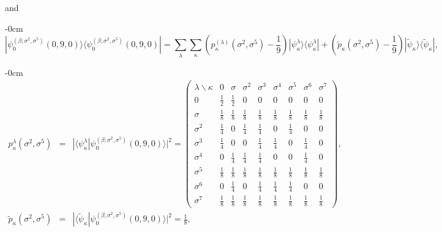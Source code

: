 \documentclass[quantumrep,article,submit,pdftex,moreauthors]{Definitions/mdpi}
\begin{document}
and

\begin{adjustwidth}{-\extralength}{0cm}
\begin{equation}
  |\psi_{0}^{(\beta;\sigma^{2},\sigma^{5})}(0,9,0)\rangle
  \langle \psi_{0}^{(\beta ; \sigma^{2},\sigma^{5})}(0,9,0)|
  = \sum_{\lambda }\sum_{\kappa} \left(
    p_{\kappa }^{(\lambda )}\left( \sigma ^{2},\sigma ^{5}\right) -\frac{1}{9}
  \right)
  |\psi_{\kappa}^{\lambda}\rangle \langle \psi_{\kappa}^{\lambda }|
  + \left( \tilde{p}_{\kappa }(\sigma ^{2},\sigma ^{5})-\frac{1}{9} \right)
  |\tilde{\psi}_{\kappa }\rangle \langle \tilde{\psi}_{\kappa }|,
\end{equation}
\end{adjustwidth}

\begin{adjustwidth}{-\extralength}{0cm}
\begin{eqnarray}
  p_{\kappa }^{\lambda }\left(\sigma^{2}, \sigma^{5}\right)
  &=& |\langle\psi_{\kappa }^{\lambda }
  |\psi_{0}^{(\beta ;\sigma ^{2},\sigma^{5})}(0,9,0)\rangle|^{2}
  = \left(\begin{array}{ccccccccc}
    \lambda \backslash \kappa  & 0 & \sigma  & \sigma ^{2} & \sigma ^{3} &
    \sigma ^{4} & \sigma ^{5} & \sigma ^{6} & \sigma ^{7} \\ 
    0 & \frac{1}{2} & \frac{1}{2} & 0 & 0 & 0 & 0 & 0 & 0 \\ [6pt]
    \sigma & \frac{1}{8} & \frac{1}{8} & \frac{1}{8} & \frac{1}{8} &
    \frac{1}{8} & \frac{1}{8} & \frac{1}{8} & \frac{1}{8} \\  [6pt]
    \sigma^{2} & \frac{1}{4} & 0 & \frac{1}{4} & \frac{1}{4} & 0 &
    \frac{1}{4} & 0 & 0 \\  [6pt]
    \sigma^{3} & \frac{1}{4} & 0 & 0 & \frac{1}{4} & \frac{1}{4} & 0 &
    \frac{1}{4} & 0 \\  [6pt]
    \sigma^{4} & 0 & \frac{1}{4} & \frac{1}{4} & \frac{1}{4} & 0 & 0 &
    \frac{1}{4} & 0 \\  [6pt]
    \sigma^{5} & \frac{1}{8} & \frac{1}{8} & \frac{1}{8} & \frac{1}{8} &
    \frac{1}{8} & \frac{1}{8} & \frac{1}{8} & \frac{1}{8} \\  [6pt]
    \sigma^{6} & 0 & \frac{1}{4} & 0 & \frac{1}{4} & \frac{1}{4} &
    \frac{1}{4} & 0 & 0 \\  [6pt]
    \sigma^{7} & \frac{1}{8} & \frac{1}{8} & \frac{1}{8} & \frac{1}{8} &
    \frac{1}{8} & \frac{1}{8} & \frac{1}{8} & \frac{1}{8}
  \end{array}\right), \\
  \tilde{p}_{\kappa }(\sigma^{2},\sigma^{5})
  &=& |\langle \tilde\psi_\kappa | \psi_0^{(\beta;\sigma^2,\sigma^5)}(0,9,0)\rangle|^2
  = \frac{1}{8},%
\end{eqnarray}
\end{adjustwidth}
\end{document}
